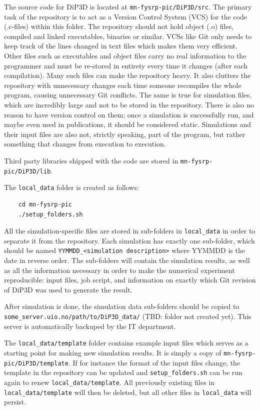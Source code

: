 \documentclass[10pt,a4paper]{article}
\begin{document}
The source code for DiP3D is located at \lstinline$mn-fysrp-pic/DiP3D/src$. The primary task of the repository is to act as a Version Control System (VCS) for the code (.c-files) within this folder. The repository should not hold object (.o) files, compiled and linked executables, binaries or similar. VCSs like Git only needs to keep track of the lines changed in text files which makes them very efficient. Other files such as executables and object files carry no real information to the programmer and must be re-stored in entirety every time it changes (after each compilation). Many such files can make the repository heavy. It also clutters the repository with unnecessary changes each time someone recompiles the whole program, causing unnecessary Git conflicts.
The same is true for simulation files, which are incredibly large and not to be stored in the repository. There is also no reason to have version control on them; once a simulation is successfully run, and maybe even used in publications, it should be considered static. Simulations and their input files are also not, strictly speaking, part of the program, but rather something that changes from execution to execution.

Third party libraries shipped with the code are stored in \lstinline$mn-fysrp-pic/DiP3D/lib$.

The \lstinline$local_data$ folder is created as follows:

\begin{lstlisting}
	cd mn-fysrp-pic
	./setup_folders.sh
\end{lstlisting}

All the simulation-specific files are stored in sub-folders in \lstinline$local_data$ in order to separate it from the repository. Each simulation has exactly one sub-folder, which should be named \lstinline$YYMMDD_<simulation description>$ where YYMMDD is the date in reverse order. The sub-folders will contain the simulation results, as well as all the information necessary in order to make the numerical experiment reproducible: input files, job script, and information on exactly which Git revision of DiP3D was used to generate the result.

After simulation is done, the simulation data sub-folders should be copied to \lstinline$some_server.uio.no/path/to/DiP3D_data/$ (TBD: folder not created yet). This server is automatically backuped by the IT department.

The \lstinline$local_data/template$ folder contains example input files which serves as a starting point for making new simulation results. It is simply a copy of \lstinline$mn-fysrp-pic/DiP3D/template$. If for instance the format of the input files change, the template in the repository can be updated and \lstinline$setup_folders.sh$ can be run again to renew \lstinline$local_data/template$. All previously existing files in \lstinline$local_data/template$ will then be deleted, but all other files in \lstinline$local_data$ will persist.
\end{document}
